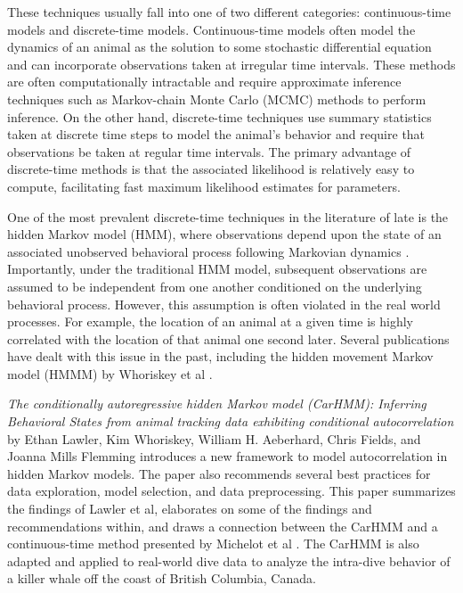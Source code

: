These techniques usually fall into one of two different categories: continuous-time models and discrete-time models. Continuous-time models often model the dynamics of an animal as the solution to some stochastic differential equation and can incorporate observations taken at irregular time intervals. These methods are often computationally intractable and require approximate inference techniques such as Markov-chain Monte Carlo (MCMC) methods to perform inference. On the other hand, discrete-time techniques use summary statistics taken at discrete time steps to model the animal's behavior and require that observations be taken at regular time intervals. The primary advantage of discrete-time methods is that the associated likelihood is relatively easy to compute, facilitating fast maximum likelihood estimates for parameters. 

One of the most prevalent discrete-time techniques in the literature of late is the hidden Markov model (HMM), where observations depend upon the state of an associated unobserved behavioral process following Markovian dynamics \cite{Patterson:2017}. Importantly, under the traditional HMM model, subsequent observations are assumed to be independent from one another conditioned on the underlying behavioral process. However, this assumption is often violated in the real world processes. For example, the location of an animal at a given time is highly correlated with the location of that animal one second later. Several publications have dealt with this issue in the past, including the hidden movement Markov model (HMMM) by Whoriskey et al \cite{Whoriskey:2016}. 

\textit{The conditionally autoregressive hidden Markov model (CarHMM): Inferring Behavioral States from animal tracking data exhibiting conditional autocorrelation} by Ethan Lawler, Kim Whoriskey, William H. Aeberhard, Chris Fields, and Joanna Mills Flemming introduces a new framework to model autocorrelation in hidden Markov models. The paper also recommends several best practices for data exploration, model selection, and data preprocessing. This paper summarizes the findings of Lawler et al, elaborates on some of the findings and recommendations within, and draws a connection between the CarHMM and a continuous-time method presented by Michelot et al \cite{Michelot:2019}. The CarHMM is also adapted and applied to real-world dive data to analyze the intra-dive behavior of a killer whale off the coast of British Columbia, Canada.